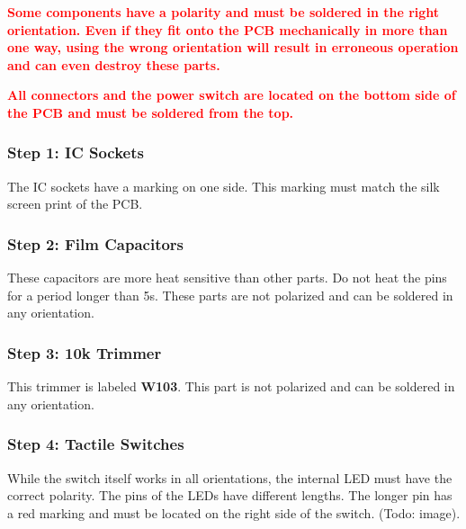\documentclass{scrartcl}
\begin{document}
\vspace{0.25cm}

\begin{tcolorbox}
    \textcolor{red}{
        \textbf{Some components have a polarity and must be soldered in the right orientation. Even if they fit onto the PCB mechanically in more than one way, using the wrong orientation will result in erroneous operation and can even destroy these parts.}
    }
\end{tcolorbox}

\vspace{0.25cm}

\begin{tcolorbox}
    \textcolor{red}{
        \textbf{All connectors and the power switch are located on the bottom side of the PCB and must be soldered from the top.}
    }
\end{tcolorbox}

\subsubsection{Step 1: IC Sockets}

The IC sockets have a marking on one side. This marking must match the silk screen print of the PCB.

\subsubsection{Step 2: Film Capacitors}

These capacitors are more heat sensitive than other parts. Do not heat the pins for a period longer than 5s. These parts are not polarized and can be soldered in any orientation.

\subsubsection{Step 3: 10k Trimmer}

This trimmer is labeled \textbf{W103}. This part is not polarized and can be soldered in any orientation.

\subsubsection{Step 4: Tactile Switches}

While the switch itself works in all orientations, the internal LED must have the correct polarity. The pins of the LEDs have different lengths. The longer pin has a red marking and must be located on the right side of the switch. (Todo: image).
\end{document}
